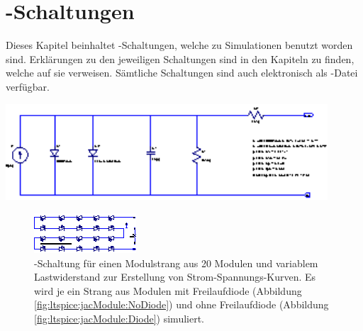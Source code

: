 \chapter{-Schaltungen}
\label{app:ltspice}

Dieses Kapitel  beinhaltet -Schaltungen, welche  zu Simulationen
benutzt worden sind. Erkl\"arungen  zu den jeweiligen Schaltungen  sind in den
Kapiteln  zu finden,  welche auf  sie verweisen. S\"amtliche  Schaltungen sind
auch elektronisch als -Datei verf\"ugbar.

\noindent\begin{minipage}{\textwidth}
    \centering
    \includegraphics[width=0.9\textwidth]{images/ltspice/jac/cell.eps}
    \label{fig:ltspice:jac:cell}
\end{minipage}

\begin{figure}[h!tb]
    \centering
    \includegraphics[width=\textwidth]{images/ltspice/jac/stringNoD.eps}
    \caption{%
        -Schaltung  f\"ur  einen   Modulstrang  aus  20  Modulen
        und   variablem  Lastwiderstand      zur  Erstellung   von
        Strom-Spannungs-Kurven. Es  wird   je  ein  Strang  aus   Modulen  mit
        Freilaufdiode   (Abbildung  \ref{fig:ltspice:jacModule:NoDiode})   und
        ohne   Freilaufdiode   (Abbildung   \ref{fig:ltspice:jacModule:Diode})
        simuliert.%
    }
    \label{fig:ltspice:string:ivCurve}
\end{figure}

